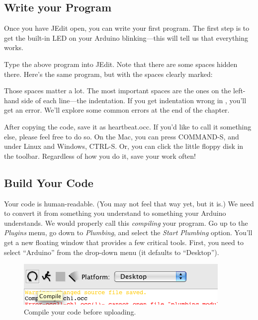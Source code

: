 \afterpage{\clearpage}

\subsection{Write your Program}
Once you have JEdit open, you can write your first program. The first step is to get the built-in LED on your Arduino blinking---this will tell us that everything works. 



Type the above program into JEdit. Note that there are some spaces hidden there. Here's the same program, but with the spaces clearly marked:



Those {\strong spaces matter a lot}. The most important spaces are the ones on the left-hand side of each line---the {\strong indentation}. If you get indentation wrong in \occam, you'll get an error. We'll explore some common errors at the end of the chapter. 

After copying the code, save it as {\code heartbeat.occ}. If you'd like to call it something else, please feel free to do so. On the Mac, you can press COMMAND-S, and under Linux and Windows, CTRL-S. Or, you can click the little floppy disk in the toolbar. Regardless of how you do it, save your work often!


\subsection{Build Your Code}
Your code is human-readable. (You may not feel that way yet, but it is.) We need to convert it from something you understand to something your Arduino understands. We would properly call this {\em compiling} your program. Go up to the {\em Plugins} menu, go down to {\em Plumbing}, and select the {\em Start Plumbing} option. You'll get a new floating window that provides a few critical tools. First, you need to select ``Arduino'' from the drop-down menu (it defaults to ``Desktop'').

\begin{figure}[h]
  \begin{center}
    \includegraphics[width=0.8\linewidth]{screenshots/20091207-compile-button}
    \caption{Compile your code before uploading.}
    \label{screenshot:compile-button}
  \end{center}
\end{figure}

